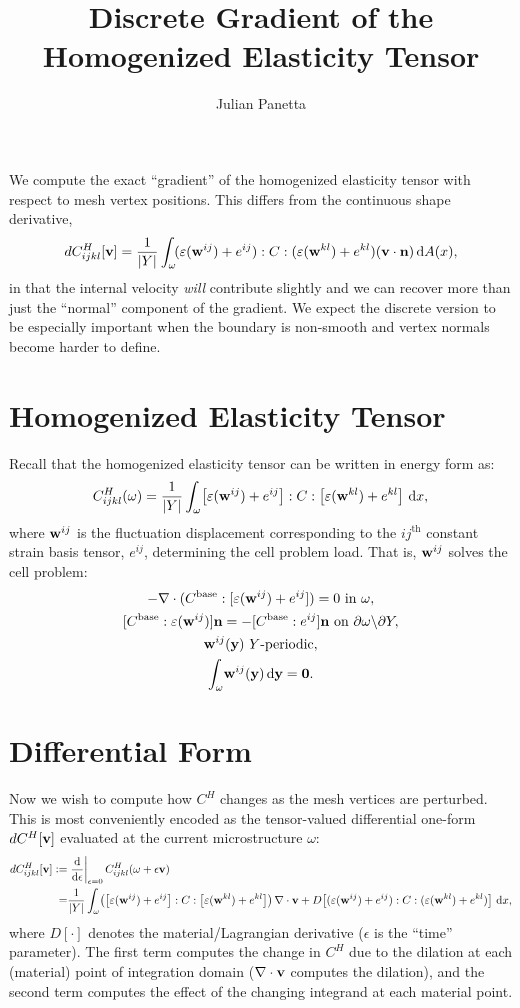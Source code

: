 \documentclass[10pt]{article}
\title{Discrete Gradient of the Homogenized Elasticity Tensor}
\author{Julian Panetta}
\renewcommand{\div}{\nabla \cdot}
\providecommand{\vint}[3][x]{\int_{#2} \! #3 \, \mathrm{d}#1}
\providecommand{\sint}[3][x]{\int_{#2} \! #3 \, \mathrm{d}A(#1)}
\providecommand{\tder}[2]{\frac{\mathrm{d} #1}{\mathrm{d} #2}}
\providecommand{\evalat}[2]{\left.#1\right|_{#2}}
\providecommand{\MDer}[1]{D\!\left[#1\right]}
\def\n{{\bf n}}
\def\y{{\bf y}}
\def\w{{\bf w}}
\def\v{{\bf v}}
\def\strain{\varepsilon}
\newcommand{\defeq}{\vcentcolon=}
\begin{document}
\maketitle

We compute the exact ``gradient'' of the homogenized elasticity tensor with
respect to mesh vertex positions. This differs from the continuous shape
derivative,
$$
dC^H_{ijkl}[\v] = \frac{1}{|Y|} \sint{\omega}{(\strain(\w^{ij}) + e^{ij}) : C : (\strain(\w^{kl}) + e^{kl}) (\v \cdot \n)},
$$
in that the internal velocity {\em will} contribute slightly and we can recover
more than just the ``normal'' component of the gradient. We expect the discrete
version to be especially important when the boundary is non-smooth and vertex normals
become harder to define.

\section{Homogenized Elasticity Tensor}
Recall that the homogenized elasticity tensor can be written in energy form as:
$$
C_{ijkl}^H(\omega) = \frac{1}{|Y|} \vint{\omega}{\left[\strain(\w^{ij}) + e^{ij}\right] : C : \left[\strain(\w^{kl}) + e^{kl}\right]},
$$
where $\w^{ij}$ is the fluctuation displacement corresponding to the $ij^\text{th}$ constant strain
basis tensor, $e^{ij}$, determining the cell problem load. That is, $\w^{ij}$ solves the cell problem:
\begin{gather*}
      -\nabla \cdot (C^\text{base} : [\strain({\bf w}^{ij}) + e^{ij}]) = 0 \text{ in } \omega, \\
    [C^\text{base} : \strain({\bf w}^{ij})]\n  =  - [C^\text{base} : e^{ij}]\n \text{ on } \partial \omega \backslash \partial Y, \\
    {\bf w}^{ij}({\y})\ Y\text{-periodic}, \\
    \int_\omega \! {\bf w}^{ij}({\y})  \, \mathrm{d} {\y} =  {\bf 0}.
\end{gather*}

\section{Differential Form}
Now we wish to compute how $C^H$ changes as the mesh vertices are perturbed.
This is most conveniently encoded as the tensor-valued differential one-form
$dC^H[\v]$ evaluated at the current microstructure $\omega$:
\begin{align}
    \label{eqn:continuous_diff}
    dC^H_{ijkl}[\v] \defeq &\evalat{\tder{}{\epsilon}}{\epsilon = 0} C^H_{ijkl}(\omega + \epsilon \v) \notag \\
    = &\frac{1}{|Y|} \vint{\omega}{\left(\left[\strain(\w^{ij}) + e^{ij}\right] : C : \left[\strain(\w^{kl}) + e^{kl}\right]\right) \div \v + \MDer{(\strain(\w^{ij}) + e^{ij}) : C : (\strain(\w^{kl}) + e^{kl})}},
\end{align}
where $\MDer{\cdot}$ denotes the material/Lagrangian derivative ($\epsilon$ is the
``time'' parameter).  The first term computes the change in $C^H$ due to the dilation at each
(material) point of integration domain ($\div \v$ computes the dilation), and the second
term computes the effect of the changing integrand at each material point.
\end{document}
